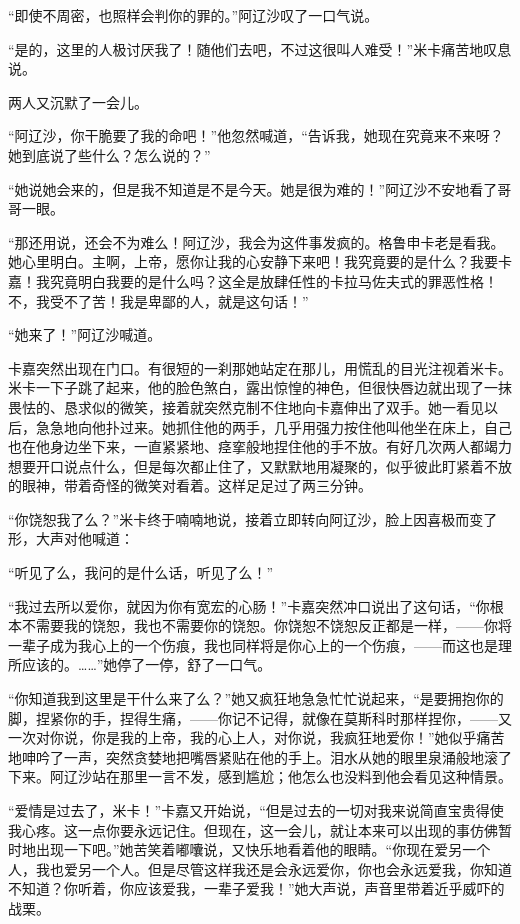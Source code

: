 \par “即使不周密，也照样会判你的罪的。”阿辽沙叹了一口气说。
\par “是的，这里的人极讨厌我了！随他们去吧，不过这很叫人难受！”米卡痛苦地叹息说。
\par 两人又沉默了一会儿。
\par “阿辽沙，你干脆要了我的命吧！”他忽然喊道，“告诉我，她现在究竟来不来呀？她到底说了些什么？怎么说的？”
\par “她说她会来的，但是我不知道是不是今天。她是很为难的！”阿辽沙不安地看了哥哥一眼。
\par “那还用说，还会不为难么！阿辽沙，我会为这件事发疯的。格鲁申卡老是看我。她心里明白。主啊，上帝，愿你让我的心安静下来吧！我究竟要的是什么？我要卡嘉！我究竟明白我要的是什么吗？这全是放肆任性的卡拉马佐夫式的罪恶性格！不，我受不了苦！我是卑鄙的人，就是这句话！”
\par “她来了！”阿辽沙喊道。
\par 卡嘉突然出现在门口。有很短的一刹那她站定在那儿，用慌乱的目光注视着米卡。米卡一下子跳了起来，他的脸色煞白，露出惊惶的神色，但很快唇边就出现了一抹畏怯的、恳求似的微笑，接着就突然克制不住地向卡嘉伸出了双手。她一看见以后，急急地向他扑过来。她抓住他的两手，几乎用强力按住他叫他坐在床上，自己也在他身边坐下来，一直紧紧地、痉挛般地捏住他的手不放。有好几次两人都竭力想要开口说点什么，但是每次都止住了，又默默地用凝聚的，似乎彼此盯紧着不放的眼神，带着奇怪的微笑对看着。这样足足过了两三分钟。
\par “你饶恕我了么？”米卡终于喃喃地说，接着立即转向阿辽沙，脸上因喜极而变了形，大声对他喊道：
\par “听见了么，我问的是什么话，听见了么！”
\par “我过去所以爱你，就因为你有宽宏的心肠！”卡嘉突然冲口说出了这句话，“你根本不需要我的饶恕，我也不需要你的饶恕。你饶恕不饶恕反正都是一样，——你将一辈子成为我心上的一个伤痕，我也同样将是你心上的一个伤痕，——而这也是理所应该的。……”她停了一停，舒了一口气。
\par “你知道我到这里是干什么来了么？”她又疯狂地急急忙忙说起来，“是要拥抱你的脚，捏紧你的手，捏得生痛，——你记不记得，就像在莫斯科时那样捏你，——又一次对你说，你是我的上帝，我的心上人，对你说，我疯狂地爱你！”她似乎痛苦地呻吟了一声，突然贪婪地把嘴唇紧贴在他的手上。泪水从她的眼里泉涌般地滚了下来。阿辽沙站在那里一言不发，感到尴尬；他怎么也没料到他会看见这种情景。
\par “爱情是过去了，米卡！”卡嘉又开始说，“但是过去的一切对我来说简直宝贵得使我心疼。这一点你要永远记住。但现在，这一会儿，就让本来可以出现的事仿佛暂时地出现一下吧。”她苦笑着嘟囔说，又快乐地看着他的眼睛。“你现在爱另一个人，我也爱另一个人。但是尽管这样我还是会永远爱你，你也会永远爱我，你知道不知道？你听着，你应该爱我，一辈子爱我！”她大声说，声音里带着近乎威吓的战栗。
